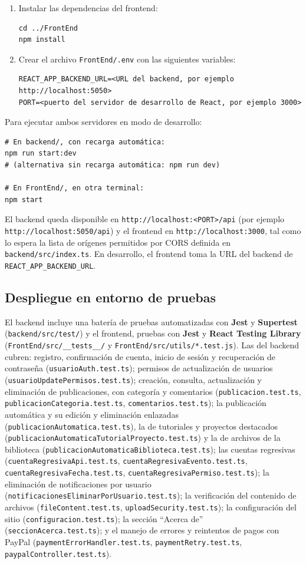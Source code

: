 \begin{enumerate}
    \item Instalar las dependencias del frontend:
\begin{verbatim}
cd ../FrontEnd
npm install
\end{verbatim}
    \item Crear el archivo \texttt{FrontEnd/.env} con las siguientes variables:
\begin{verbatim}
REACT_APP_BACKEND_URL=<URL del backend, por ejemplo http://localhost:5050>
PORT=<puerto del servidor de desarrollo de React, por ejemplo 3000>
\end{verbatim}
\end{enumerate}

Para ejecutar ambos servidores en modo de desarrollo:
\begin{verbatim}
# En backend/, con recarga automática:
npm run start:dev
# (alternativa sin recarga automática: npm run dev)

# En FrontEnd/, en otra terminal:
npm start
\end{verbatim}
El backend queda disponible en \texttt{http://localhost:<PORT>/api} (por ejemplo \texttt{http://localhost:5050/api}) y el frontend en \texttt{http://localhost:3000}, tal como lo espera la lista de orígenes permitidos por CORS definida en \texttt{backend/src/index.ts}. En desarrollo, el frontend toma la URL del backend de \texttt{REACT\_APP\_BACKEND\_URL}.

\subsection{Despliegue en entorno de pruebas}
El backend incluye una batería de pruebas automatizadas con \textbf{Jest} y \textbf{Supertest} (\texttt{backend/src/test/}) y el frontend, pruebas con \textbf{Jest} y \textbf{React Testing Library} (\texttt{FrontEnd/src/\_\_tests\_\_/} y \texttt{FrontEnd/src/utils/*.test.js}). Las del backend cubren: registro, confirmación de cuenta, inicio de sesión y recuperación de contraseña (\texttt{usuarioAuth.test.ts}); permisos de actualización de usuarios (\texttt{usuarioUpdatePermisos.test.ts}); creación, consulta, actualización y eliminación de publicaciones, con categoría y comentarios (\texttt{publicacion.test.ts}, \texttt{publicacionCategoria.test.ts}, \texttt{comentarios.test.ts}); la publicación automática y su edición y eliminación enlazadas (\texttt{publicacionAutomatica.test.ts}), la de tutoriales y proyectos destacados (\texttt{publicacionAutomaticaTutorialProyecto.test.ts}) y la de archivos de la biblioteca (\texttt{publicacionAutomaticaBiblioteca.test.ts}); las cuentas regresivas (\texttt{cuentaRegresivaApi.test.ts}, \texttt{cuentaRegresivaEvento.test.ts}, \texttt{cuentaRegresivaFecha.test.ts}, \texttt{cuentaRegresivaPermiso.test.ts}); la eliminación de notificaciones por usuario (\texttt{notificacionesEliminarPorUsuario.test.ts}); la verificación del contenido de archivos (\texttt{fileContent.test.ts}, \texttt{uploadSecurity.test.ts}); la configuración del sitio (\texttt{configuracion.test.ts}); la sección ``Acerca de'' (\texttt{seccionAcerca.test.ts}); y el manejo de errores y reintentos de pagos con PayPal (\texttt{paymentErrorHandler.test.ts}, \texttt{paymentRetry.test.ts}, \texttt{paypalController.test.ts}).

